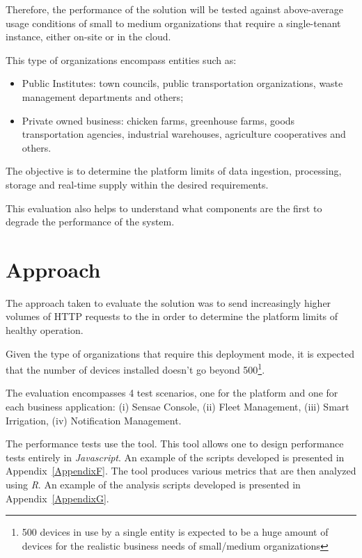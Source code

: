 Therefore, the performance of the solution will be tested against above-average usage conditions of small to medium organizations that require a single-tenant instance, either on-site or in the cloud.

This type of organizations encompass entities such as:

\begin{itemize}
    \item Public Institutes: town councils, public transportation organizations, waste management departments and others;
    \item Private owned business: chicken farms, greenhouse farms, goods transportation agencies, industrial warehouses, agriculture cooperatives and others.
\end{itemize}

The objective is to determine the platform limits of data ingestion, processing, storage and real-time supply within the desired requirements.

This evaluation also helps to understand what components are the first to degrade the performance of the system.

\section{Approach}
\label{sec:evaluation:approach}

The approach taken to evaluate the solution was to send increasingly higher volumes of HTTP requests to the  in order to determine the platform limits of healthy operation.

Given the type of organizations that require this deployment mode, it is expected that the number of devices installed doesn't go beyond 500\footnote{500 devices in use by a single entity is expected to be a huge amount of devices for the realistic business needs of small/medium organizations}.

The evaluation encompasses 4 test scenarios, one for the platform and one for each business application: (i) Sensae Console, (ii) Fleet Management, (iii) Smart Irrigation, (iv) Notification Management.

The performance tests use the  tool. This tool allows one to design performance tests entirely in \textit{Javascript}. An example of the scripts developed is presented in Appendix~\ref{AppendixF}. The  tool produces various metrics that are then analyzed using \textit{R}. An example of the analysis scripts developed is presented in Appendix~\ref{AppendixG}.

